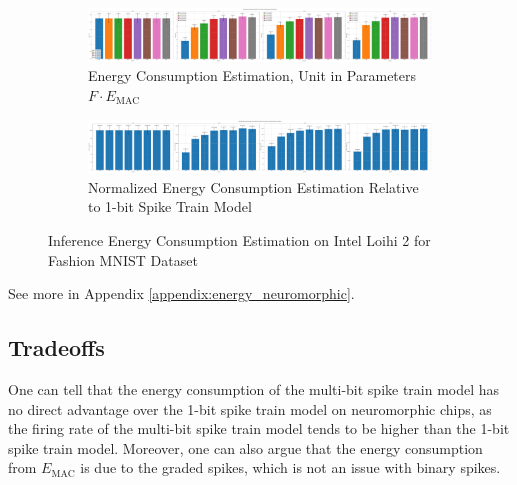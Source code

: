         \begin{figure}[!htpb]
            \centering
            \begin{subfigure}[H]{\textwidth}
                \includegraphics[width=\textwidth]{../standard/FashionMNIST/plots/fashionmnist_test_energy_nh.pdf}
                \caption{Energy Consumption Estimation, Unit in Parameters $F\cdot E_{\text{MAC}}$}
            \end{subfigure}
            \hfill
            \begin{subfigure}[H]{\textwidth}
                \includegraphics[width=\textwidth]{../standard/FashionMNIST/plots/fashionmnist_test_relative_energy_nh.pdf}
                \caption{Normalized Energy Consumption Estimation Relative to 1-bit Spike Train Model}
            \end{subfigure}
            \caption{Inference Energy Consumption Estimation on Intel Loihi 2 for Fashion MNIST Dataset}
            \label{fig:inference_energy_nh}
        \end{figure}

        See more in Appendix \ref{appendix:energy_neuromorphic}.

    \subsection{Tradeoffs}
        One can tell that the energy consumption of the multi-bit spike train model has no direct advantage over the 1-bit spike train model on neuromorphic chips, as the firing rate of the multi-bit spike train model tends to be higher than the 1-bit spike train model. Moreover, one can also argue that the energy consumption from $E_{\text{MAC}}$ is due to the graded spikes, which is not an issue with binary spikes. 

